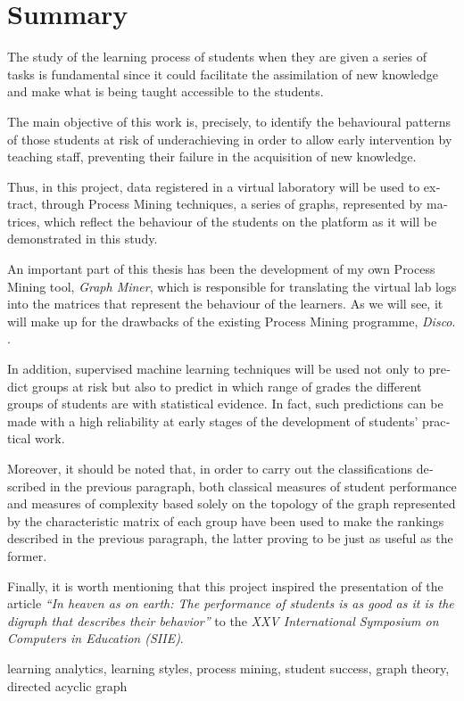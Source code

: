 \chapter*{Summary}

\begin{otherlanguage}{english}

The study of the learning process of students when they are given a series of tasks is fundamental since it could facilitate the assimilation of new knowledge and make what is being taught accessible to the students.

The main objective of this work is, precisely, to identify the behavioural patterns of those students at risk of underachieving in order to allow early intervention by teaching staff, preventing their failure in the acquisition of new knowledge.

Thus, in this project, data registered in a virtual laboratory will be used to extract, through Process Mining techniques, a series of graphs, represented by matrices, which reflect the behaviour of the students on the platform as it will be demonstrated in this study.

An important part of this thesis has been the development of my own Process Mining tool, \emph{Graph Miner}, which is responsible for translating the virtual lab logs into the matrices that represent the behaviour of the learners. As we will see, it will make up for the drawbacks of the existing Process Mining programme, \emph{Disco}. \cite{gunther2012disco}.

In addition, supervised machine learning techniques will be used not only to predict groups at risk but also to predict in which range of grades the different groups of students are with statistical evidence. In fact, such predictions can be made with a high reliability at early stages of the development of students' practical work.

Moreover, it should be noted that, in order to carry out the classifications described in the previous paragraph, both classical measures of student performance and measures of complexity based solely on the topology of the graph represented by the characteristic matrix of each group have been used to make the rankings described in the previous paragraph, the latter proving to be just as useful as the former.

Finally, it is worth mentioning that this project inspired the presentation of the article \emph{``In heaven as on earth: The performance of students is as good as it is the digraph that describes their behavior''} \cite{SIIE23} to the \emph{XXV International Symposium on Computers in Education (SIIE)}.

\small{ learning analytics, \; learning styles, \; process mining, \; student success, \; graph theory, \; directed acyclic graph}

\end{otherlanguage}